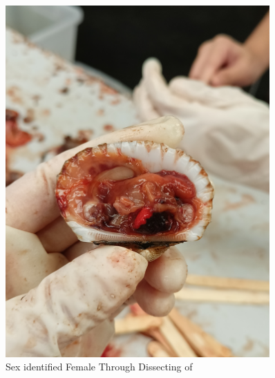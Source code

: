 \begin{figure}[!htbp]
	\centering
	\includegraphics[width=0.9\textwidth]{figures/dissecting_female.jpg}
	\caption{Sex identified Female Through Dissecting of \Tegillarcagranosa}
\end{figure}

